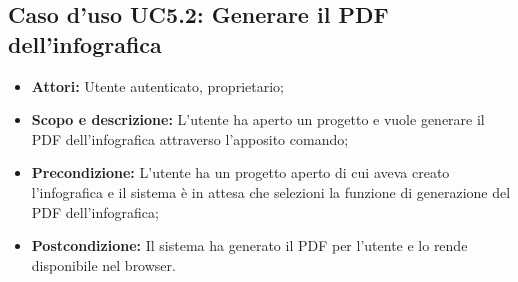 	\subsection{Caso d'uso UC5.2: Generare il PDF dell'infografica}
	\begin{itemize}
		\item \textbf{Attori:} Utente autenticato, proprietario;
		\item \textbf{Scopo e descrizione:} L'utente ha aperto un progetto e vuole generare il PDF dell'\gls{infografica} attraverso l'apposito comando;
		\item \textbf{Precondizione:} L'utente ha un progetto aperto di cui aveva creato l'\gls{infografica} e il sistema è in attesa che selezioni la funzione di generazione del PDF dell'\gls{infografica};
		\item \textbf{Postcondizione:} Il sistema ha generato il PDF per l'utente e lo rende disponibile nel \gls{browser}.
	\end{itemize}


